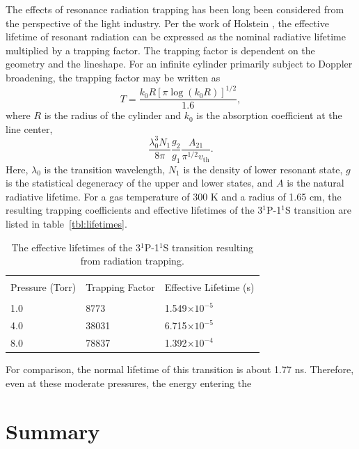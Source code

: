 The effects of resonance radiation trapping has been long been considered from
the perspective of the light industry. Per the work of Holstein
\cite{Holstein1951}, the effective lifetime of resonant radiation can be
expressed as the nominal radiative lifetime multiplied by a trapping factor. The
trapping factor is dependent on the geometry and the lineshape. For an infinite
cylinder primarily subject to Doppler broadening, the trapping factor may be
written as
\begin{equation}
  T = \frac{k_0R\left[\pi\log(k_0R)\right]^{1/2}}{1.6},
\end{equation}
where $R$ is the radius of the cylinder and $k_0$ is the absorption coefficient
at the line center,
\begin{equation}
  \frac{\lambda_0^3N_1}{8\pi} \frac{g_2}{g_1} \frac{A_{21}}{\pi^{1/2}v_\mathrm{th}}.
\end{equation}
Here, $\lambda_0$ is the transition wavelength, $N_1$ is the density of lower
resonant state, $g$ is the statistical degeneracy of the upper and lower states,
and $A$ is the natural radiative lifetime. For a gas temperature of 300 K and a
radius of 1.65 cm, the resulting trapping coefficients and effective lifetimes of
the 3$^1$P-1$^1$S transition are listed in table~\ref{tbl:lifetimes}.
\begin{table}
  \centering
  \caption{The effective lifetimes of the 3$^1$P-1$^1$S transition resulting
    from radiation trapping.}
  \begin{tabular}{lll}
    \toprule \\
    Pressure (Torr) & Trapping Factor & Effective Lifetime (s) \\
    \midrule \\
    1.0             & 8773            & 1.549$\times10^{-5}$   \\
    4.0             & 38031           & 6.715$\times10^{-5}$   \\
    8.0             & 78837           & 1.392$\times10^{-4}$   \\
    \bottomrule
  \end{tabular}
\end{table}
For comparison, the normal lifetime of this transition is about 1.77 ns.
Therefore, even at these moderate pressures, the energy entering the 


\section{Summary}

